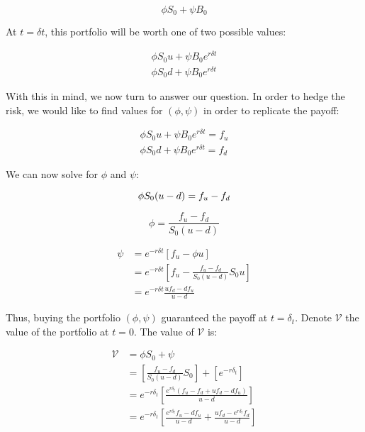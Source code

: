 \documentclass{article}
\begin{document}
\begin{equation*}
    \phi S_0 + \psi B_0
\end{equation*}

At $t=\delta t$, this portfolio will be worth one of two possible values:

\begin{align*}
    \phi S_0u + \psi B_0e^{r \delta t}\\
    \phi S_0d + \psi B_0e^{r \delta t}
\end{align*}

With this in mind, we now turn to answer our question. In order to hedge the risk, we would like to find values for $(\phi, \psi)$ in order to replicate the payoff:

\begin{align*}
    \phi S_0u + \psi B_0e^{r \delta t} = f_u\\
    \phi S_0d + \psi B_0e^{r \delta t} = f_d
\end{align*}

We can now solve for $\phi$ and $\psi$:

\begin{equation*}
    \phi S_0(u - d) = f_u - f_d\\
\end{equation*}

\begin{equation} \label{eq:phi}
    \phi = \frac{f_u - f_d}{S_0(u-d)}
\end{equation}

\begin{align*}
    \psi &= e^{-r\delta t} [f_u - \phi u]\\
         &= e^{-r\delta t} \left[f_u - \frac{f_u - f_d}{S_0(u - d)} S_0u\right]\\
         &= e^{-r\delta t} \frac{uf_d - df_u}{u -d}
\end{align*}

Thus, buying the portfolio $(\phi, \psi)$ guaranteed the payoff at $t=\delta_t$. Denote $\mathcal{V}$ the value of the portfolio at $t=0$. The value of $\mathcal{V}$ is:

\begin{align*}
    \mathcal{V} &= \phi S_0 + \psi\\
                &= \left[\frac{f_u - f_d}{S_0(u - d)}S_0\right] + \left[e^{-r\delta_t}\right]\\
                &= e^{-r\delta_t}\left[\frac{e^{r\delta_t}(f_u - f_d + uf_d - df_u)}{u - d}\right]\\
                &= e^{-r\delta_t}\left[\frac{e^{r\delta_t}f_u - df_u}{u-d} + \frac{uf_d - e^{r\delta_t}f_d}{u-d}\right]
\end{align*}
\end{document}
